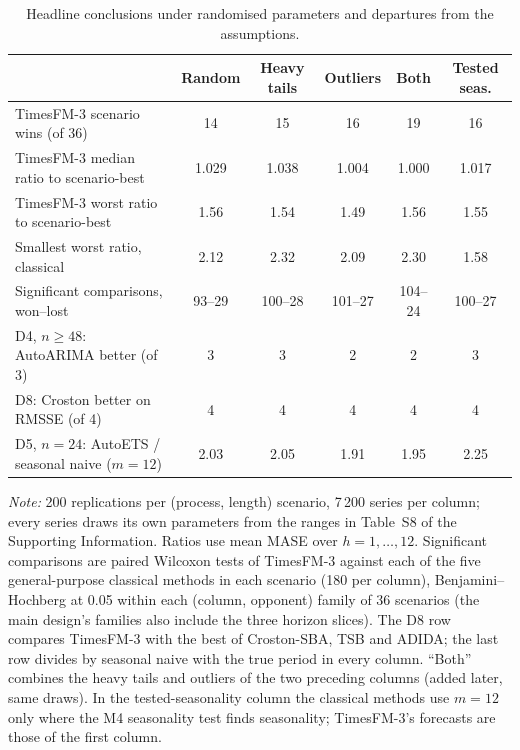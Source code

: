 \begin{table}[!htbp]
\centering
\begin{threeparttable}
\caption{Headline conclusions under randomised parameters and departures from the assumptions.}
\label{tab:robust-design}
\small\setlength{\tabcolsep}{4pt}
\begin{tabular}{lccccc}
\toprule
 & Random & Heavy tails & Outliers & Both & Tested seas. \\
\midrule
TimesFM-3 scenario wins (of 36) & 14 & 15 & 16 & 19 & 16 \\
TimesFM-3 median ratio to scenario-best & 1.029 & 1.038 & 1.004 & 1.000 & 1.017 \\
TimesFM-3 worst ratio to scenario-best & 1.56 & 1.54 & 1.49 & 1.56 & 1.55 \\
Smallest worst ratio, classical & 2.12 & 2.32 & 2.09 & 2.30 & 1.58 \\
Significant comparisons, won--lost & 93--29 & 100--28 & 101--27 & 104--24 & 100--27 \\
D4, $n \geq 48$: AutoARIMA better (of 3) & 3 & 3 & 2 & 2 & 3 \\
D8: Croston better on RMSSE (of 4) & 4 & 4 & 4 & 4 & 4 \\
D5, $n = 24$: AutoETS / seasonal naive ($m = 12$) & 2.03 & 2.05 & 1.91 & 1.95 & 2.25 \\
\bottomrule
\end{tabular}
\begin{tablenotes}[flushleft]\footnotesize
\item \textit{Note:} 200 replications per (process, length) scenario, 7\,200 series per column; every series draws its own parameters from the ranges in Table~S8 of the Supporting Information. Ratios use mean MASE over $h = 1, \dots, 12$. Significant comparisons are paired Wilcoxon tests of TimesFM-3 against each of the five general-purpose classical methods in each scenario (180 per column), Benjamini--Hochberg at 0.05 within each (column, opponent) family of 36 scenarios (the main design's families also include the three horizon slices). The D8 row compares TimesFM-3 with the best of Croston-SBA, TSB and ADIDA; the last row divides by seasonal naive with the true period in every column. ``Both'' combines the heavy tails and outliers of the two preceding columns (added later, same draws). In the tested-seasonality column the classical methods use $m = 12$ only where the M4 seasonality test finds seasonality; TimesFM-3's forecasts are those of the first column.
\end{tablenotes}
\end{threeparttable}
\end{table}
